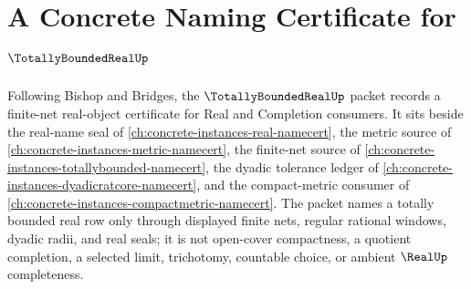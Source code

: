 \chapter{A Concrete Naming Certificate for $\TotallyBoundedRealUp$}
\label{ch:concrete-instances-totally-bounded-real-namecert}

Following Bishop and Bridges, the $\TotallyBoundedRealUp$ packet records a finite-net real-object certificate for Real and Completion consumers. It sits beside the real-name seal of \autoref{ch:concrete-instances-real-namecert}, the metric source of \autoref{ch:concrete-instances-metric-namecert}, the finite-net source of \autoref{ch:concrete-instances-totallybounded-namecert}, the dyadic tolerance ledger of \autoref{ch:concrete-instances-dyadicratcore-namecert}, and the compact-metric consumer of \autoref{ch:concrete-instances-compactmetric-namecert}. The packet names a totally bounded real row only through displayed finite nets, regular rational windows, dyadic radii, and real seals; it is not open-cover compactness, a quotient completion, a selected limit, trichotomy, countable choice, or ambient $\RealUp$ completeness.

